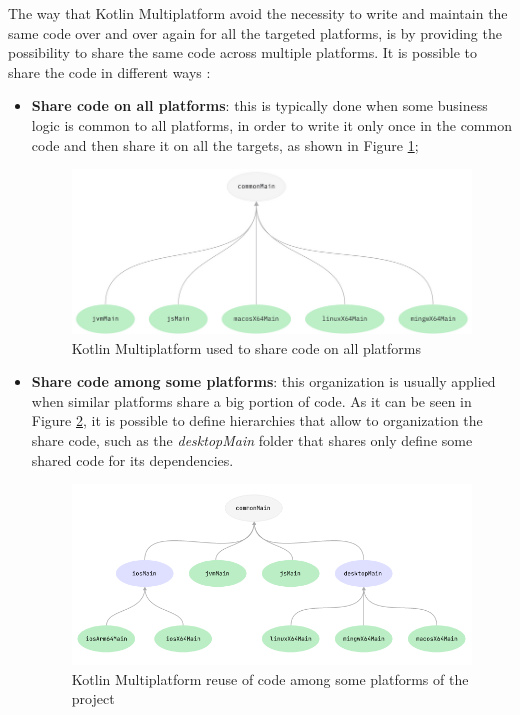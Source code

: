 The way that Kotlin Multiplatform avoid the necessity to write and maintain the same code over and over again for all the targeted platforms, is by providing the possibility to share the same code across multiple platforms.\newline
It is possible to share the code in different ways \cite{kotlin_multiplatform_share_code}:
\begin{itemize}
    \item \textbf{Share code on all platforms}: this is typically done when some business logic is common to all platforms, in order to write it only once in the common code and then share it on all the targets, as shown in Figure \ref{fig:km_share_code_on_all_platforms};
    \begin{figure}[!ht]
        \centering
        \includegraphics[scale=0.86]{document/chapters/4-collektive/images/km_share_code_on_all_platforms.png}
        \caption{Kotlin Multiplatform used to share code on all platforms \cite{kotlin_multiplatform_share_code}}
        \label{fig:km_share_code_on_all_platforms}
    \end{figure}
    \item \textbf{Share code among some platforms}: this organization is usually applied when similar platforms share a big portion of code. As it can be seen in Figure \ref{fig:km_reuse_code}, it is possible to define hierarchies that allow to organization the share code, such as the \textit{desktopMain} folder that shares only define some shared code for its dependencies.
    \begin{figure}[!ht]
        \centering
        \includegraphics[scale=0.97]{document/chapters/4-collektive/images/kotlin_multiplatform_reuse_code.png}
        \caption{Kotlin Multiplatform reuse of code among some platforms of the project \cite{kotlin_multiplatform_overview}}
        \label{fig:km_reuse_code}
    \end{figure}
\end{itemize}

